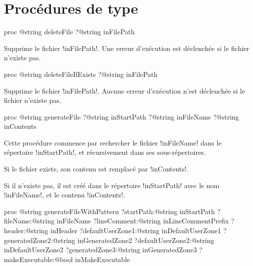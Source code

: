 \section{Procédures de type}




\begin{galgasbox}
proc @string deleteFile ?@string inFilePath
\end{galgasbox}

Supprime le fichier \ggs!inFilePath!. Une erreur d'exécution est déclenchée si le fichier n'existe pas.






\begin{galgasbox}
proc @string deleteFileIfExists ?@string inFilePath
\end{galgasbox}

Supprime le fichier \ggs!inFilePath!. Aucune erreur d'exécution n'est déclenchée si le fichier n'existe pas.








\begin{galgasbox}
proc @string generateFile
   ?@string inStartPath
   ?@string inFileName
   ?@string inContents
\end{galgasbox}

Cette procédure commence par rechercher le fichier \ggs!inFileName! dans le répertoire \ggs!inStartPath!, et récursivement dans ses sous-répertoires.

Si le fichier existe, son contenu est remplacé par \ggs!inContents!.

Si il n'existe pas, il est créé dans le répertoire \ggs!inStartPath! avec le nom \ggs!inFileName!, et le contenu \ggs!inContents!.










\begin{galgasbox}
proc @string generateFileWithPattern
   ?startPath:@string inStartPath
   ?fileName:@string inFileName
   ?lineComment:@string inLineCommentPrefix
   ?header:@string inHeader
   ?defaultUserZone1:@string inDefaultUserZone1
   ?generatedZone2:@string inGeneratedZone2
   ?defaultUserZone2:@string inDefaultUserZone2
   ?generatedZone3:@string inGeneratedZone3
   ?makeExecutable:@bool inMakeExecutable
\end{galgasbox}






